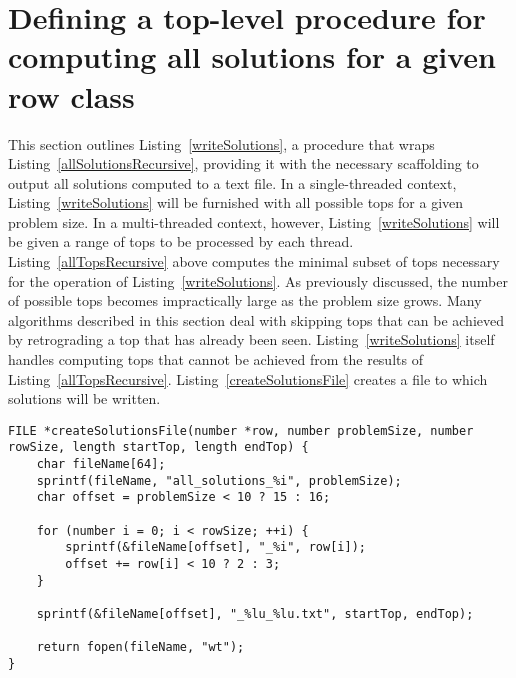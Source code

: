 \section{Defining a top-level procedure for computing all solutions for a given row class}

This section outlines Listing~\ref{writeSolutions}, a procedure that wraps Listing~\ref{allSolutionsRecursive}, providing it with the necessary scaffolding to output all solutions computed to a text file. In a single-threaded context, Listing~\ref{writeSolutions} will be furnished with all possible tops for a given problem size. In a multi-threaded context, however, Listing~\ref{writeSolutions} will be given a range of tops to be processed by each thread. Listing~\ref{allTopsRecursive} above computes the minimal subset of tops necessary for the operation of Listing~\ref{writeSolutions}. As previously discussed, the number of possible tops becomes impractically large as the problem size grows. Many algorithms described in this section deal with skipping tops that can be achieved by retrograding a top that has already been seen. Listing~\ref{writeSolutions} itself handles computing tops that cannot be achieved from the results of Listing~\ref{allTopsRecursive}. Listing~\ref{createSolutionsFile} creates a file to which solutions will be written.

\begin{lstlisting}[caption={Creating a text file to hold all thread-specific solutions.},label={createSolutionsFile}]
FILE *createSolutionsFile(number *row, number problemSize, number rowSize, length startTop, length endTop) {
    char fileName[64];
    sprintf(fileName, "all_solutions_%i", problemSize);
    char offset = problemSize < 10 ? 15 : 16;

    for (number i = 0; i < rowSize; ++i) {
        sprintf(&fileName[offset], "_%i", row[i]);
        offset += row[i] < 10 ? 2 : 3;
    }

    sprintf(&fileName[offset], "_%lu_%lu.txt", startTop, endTop);

    return fopen(fileName, "wt");
}
\end{lstlisting}

